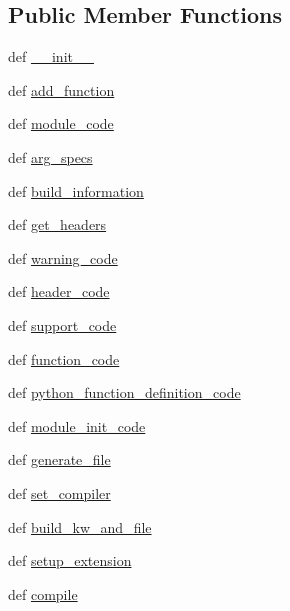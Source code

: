 \subsection*{Public Member Functions}
\begin{DoxyCompactItemize}
\item 
def \hyperlink{classscipy_1_1weave_1_1ext__tools_1_1ext__module_a4a7680ae2d1585aaf7e33c9bcc94e54f}{\+\_\+\+\_\+init\+\_\+\+\_\+}
\item 
def \hyperlink{classscipy_1_1weave_1_1ext__tools_1_1ext__module_af47fadc07dc277ab4d31f44f6faa48bf}{add\+\_\+function}
\item 
def \hyperlink{classscipy_1_1weave_1_1ext__tools_1_1ext__module_aae84120eddb76d427bd9691b54de57ed}{module\+\_\+code}
\item 
def \hyperlink{classscipy_1_1weave_1_1ext__tools_1_1ext__module_a9fa5d30aab4a1160547f67914f0a8ba7}{arg\+\_\+specs}
\item 
def \hyperlink{classscipy_1_1weave_1_1ext__tools_1_1ext__module_aa44a4f53df164b30490b6b2d37e70fa3}{build\+\_\+information}
\item 
def \hyperlink{classscipy_1_1weave_1_1ext__tools_1_1ext__module_a3aa515d0de650d4475857b9cad570405}{get\+\_\+headers}
\item 
def \hyperlink{classscipy_1_1weave_1_1ext__tools_1_1ext__module_aaabe1ae8effc09e4b71ffaa06da1450c}{warning\+\_\+code}
\item 
def \hyperlink{classscipy_1_1weave_1_1ext__tools_1_1ext__module_af53b3193325271741e40f105f33fbb44}{header\+\_\+code}
\item 
def \hyperlink{classscipy_1_1weave_1_1ext__tools_1_1ext__module_a22ed7a3ea09d8236538e399708ecd6a8}{support\+\_\+code}
\item 
def \hyperlink{classscipy_1_1weave_1_1ext__tools_1_1ext__module_ad80088c559d216b6d3ccb4b9e541a59f}{function\+\_\+code}
\item 
def \hyperlink{classscipy_1_1weave_1_1ext__tools_1_1ext__module_ad574913a9b96feb6093af441d0de165d}{python\+\_\+function\+\_\+definition\+\_\+code}
\item 
def \hyperlink{classscipy_1_1weave_1_1ext__tools_1_1ext__module_afce1d135b283c4a8baa476041dfeb897}{module\+\_\+init\+\_\+code}
\item 
def \hyperlink{classscipy_1_1weave_1_1ext__tools_1_1ext__module_a1685e1bfb72c5ec221164ed9860fd39a}{generate\+\_\+file}
\item 
def \hyperlink{classscipy_1_1weave_1_1ext__tools_1_1ext__module_a243d92483a99f548b558a966d8e0f646}{set\+\_\+compiler}
\item 
def \hyperlink{classscipy_1_1weave_1_1ext__tools_1_1ext__module_a9c997a269ec3bdcf94f985cde857f9a7}{build\+\_\+kw\+\_\+and\+\_\+file}
\item 
def \hyperlink{classscipy_1_1weave_1_1ext__tools_1_1ext__module_a6095211dd93412c70c1fca745a5660bc}{setup\+\_\+extension}
\item 
def \hyperlink{classscipy_1_1weave_1_1ext__tools_1_1ext__module_ad8728e27751a43c561b4c4ab3db90104}{compile}
\end{DoxyCompactItemize}
